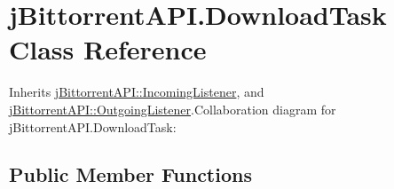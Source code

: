 \hypertarget{classj_bittorrent_a_p_i_1_1_download_task}{
\section{jBittorrentAPI.DownloadTask Class Reference}
\label{classj_bittorrent_a_p_i_1_1_download_task}
}


Inherits \hyperlink{interfacej_bittorrent_a_p_i_1_1_incoming_listener}{jBittorrentAPI::IncomingListener}, and \hyperlink{interfacej_bittorrent_a_p_i_1_1_outgoing_listener}{jBittorrentAPI::OutgoingListener}.Collaboration diagram for jBittorrentAPI.DownloadTask:\subsection*{Public Member Functions}
